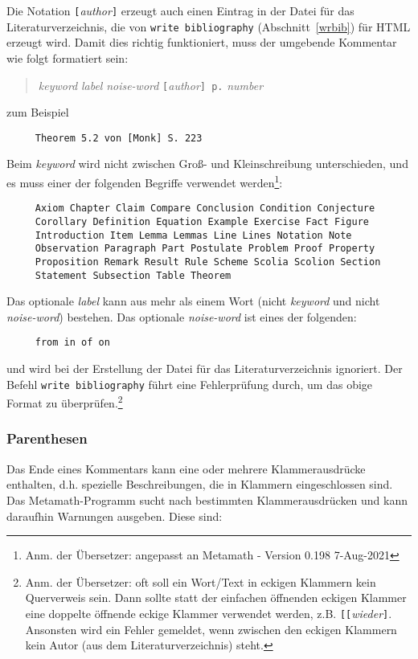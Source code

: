 Die Notation \texttt{[}{\em author}\texttt{]} erzeugt auch einen Eintrag in der Datei für das Literaturverzeichnis, die von \texttt{write bibliography} (Abschnitt~\ref{wrbib}) für {\sc HTML} erzeugt wird. Damit dies richtig funktioniert, muss der umgebende Kommentar wie folgt formatiert sein:
\begin{quote}
    {\em keyword} {\em label} {\em noise-word}
     \texttt{[}{\em author}\texttt{] p.} {\em number}
\end{quote}
zum Beispiel
\begin{verbatim}
     Theorem 5.2 von [Monk] S. 223
\end{verbatim}
Beim {\em keyword} wird nicht zwischen Groß- und Kleinschreibung unterschieden, und es muss einer der folgenden Begriffe verwendet werden\footnote{Anm. der Übersetzer: angepasst an Metamath - Version 0.198 7-Aug-2021}:
\begin{verbatim}    
     Axiom Chapter Claim Compare Conclusion Condition Conjecture
     Corollary Definition Equation Example Exercise Fact Figure
     Introduction Item Lemma Lemmas Line Lines Notation Note
     Observation Paragraph Part Postulate Problem Proof Property
     Proposition Remark Result Rule Scheme Scolia Scolion Section
     Statement Subsection Table Theorem
\end{verbatim}
Das optionale {\em label} kann aus mehr als einem Wort (nicht {\em keyword} und nicht {\em noise-word}) bestehen. Das optionale {\em noise-word} ist eines der folgenden:
\begin{verbatim}
     from in of on
\end{verbatim}
und wird bei der Erstellung der Datei für das Literaturverzeichnis ignoriert.  Der Befehl \texttt{write biblio\-graphy} führt eine Fehlerprüfung durch, um das obige Format zu überprüfen.\footnote{Anm. der Übersetzer: oft soll ein Wort/Text in eckigen Klammern kein Querverweis sein. Dann sollte statt der einfachen öffnenden eckigen Klammer eine doppelte öffnende eckige Klammer verwendet werden, z.B. \texttt{[}\texttt{[}{\em wieder}\texttt{]}. Ansonsten wird ein Fehler gemeldet, wenn zwischen den eckigen Klammern kein Autor (aus dem Literaturverzeichnis) steht.}

\subsubsection{Parenthesen}\label{parentheticals}

Das Ende eines Kommentars kann eine oder mehrere Klammerausdrücke enthalten, d.h. spezielle Beschreibungen, die in Klammern eingeschlossen sind. Das Metamath-Programm sucht nach bestimmten Klammerausdrücken und kann daraufhin Warnungen ausgeben. Diese sind:

